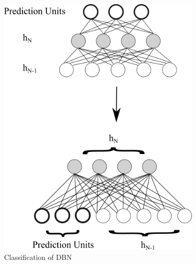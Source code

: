 \documentclass[12pt]{article}
\begin{document}
\begin{figure}[h]
\centering
\includegraphics[height=5.0in]{DBNclass.png}
\caption{Classification of DBN} \label{fig:side:a}
\end{figure}
\end{document}

